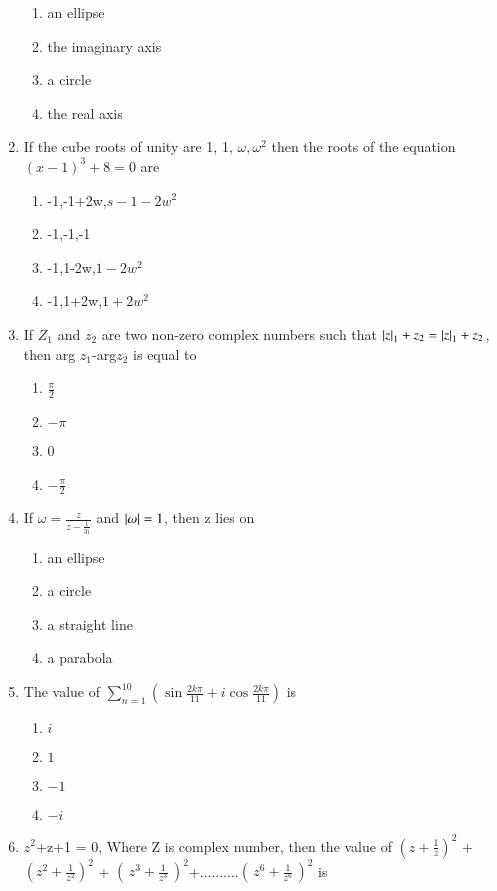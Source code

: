 \begin{enumerate}[label=\arabic*.,ref=\thesubsection.\theenumi]
\begin{enumerate}
    \item  an ellipse
    \item  the imaginary axis    
    \item  a circle
    \item  the real axis
    \end{enumerate}
 \item If the cube roots of unity are 1, 1, $\omega, \omega^2$ then the roots of the equation $(x-1)^3+8 = 0$ are 
    \begin{enumerate}
    \item  -1,-1+2w,$s-1-2w^2$
    \item  -1,-1,-1    
    \item  -1,1-2w,$1-2w^2$
    \item  -1,1+2w,$1+2w^2$
    \end{enumerate}
    \item If $Z_1$ and $z_2$  are two non-zero complex numbers such that $\left\vert z\right\vert_1 + z_2 = \left\vert z\right\vert_1+ z_2$, then arg $z_1$-arg$z_2$ is equal to
    \begin{enumerate}
    \item  $\frac{\pi}{2}$    
    \item  $-\pi$    
    \item  0
    \item  $-\frac{\pi}{2}$
    \end{enumerate}
    \item If $\omega = \frac{z}{z-\frac{1}{3i}}$ and $\left\vert\omega\right\vert = 1$, then z lies on 
    \begin{enumerate}
    \item  an ellipse    
    \item  a circle    
    \item  a straight line
    \item  a parabola
    \end{enumerate}
    \item The value of $\sum_{n=1}^{10}(\sin\frac{2k\pi}{11}+i\cos\frac{2k\pi}{11})$ is 
    \begin{enumerate}
    \item  $i$    
    \item  $1$    
    \item  $-1$
    \item  $-i$    
    \end{enumerate}
    \item $z^2$+z+1 = 0, Where Z is complex number, then the value of
    $( z+\frac{1}{z})^2$ + $( z^2+\frac{1}{z^2})^2$ + $( \,z^3+\frac{1}{z^3}\,)^2$+..........$( \,z^6+\frac{1}{z^6}\,)^2$ is

\end{enumerate}
